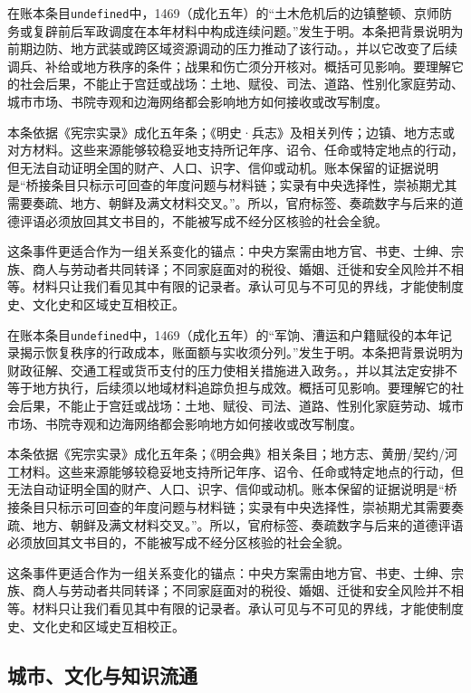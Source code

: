 在账本条目\texttt{undefined}中，1469（成化五年）的“土木危机后的边镇整顿、京师防务或复辟前后军政调度在本年材料中构成连续问题。”发生于明。本条把背景说明为前期边防、地方武装或跨区域资源调动的压力推动了该行动。，并以它改变了后续调兵、补给或地方秩序的条件；战果和伤亡须分开核对。概括可见影响。要理解它的社会后果，不能止于宫廷或战场：土地、赋役、司法、道路、性别化家庭劳动、城市市场、书院寺观和边海网络都会影响地方如何接收或改写制度。

本条依据《宪宗实录》成化五年条；《明史·兵志》及相关列传；边镇、地方志或对方材料。这些来源能够较稳妥地支持所记年序、诏令、任命或特定地点的行动，但无法自动证明全国的财产、人口、识字、信仰或动机。账本保留的证据说明是“桥接条目只标示可回查的年度问题与材料链；实录有中央选择性，崇祯期尤其需要奏疏、地方、朝鲜及满文材料交叉。”。所以，官府标签、奏疏数字与后来的道德评语必须放回其文书目的，不能被写成不经分区核验的社会全貌。

这条事件更适合作为一组关系变化的锚点：中央方案需由地方官、书吏、士绅、宗族、商人与劳动者共同转译；不同家庭面对的税役、婚姻、迁徙和安全风险并不相等。材料只让我们看见其中有限的记录者。承认可见与不可见的界线，才能使制度史、文化史和区域史互相校正。

在账本条目\texttt{undefined}中，1469（成化五年）的“军饷、漕运和户籍赋役的本年记录揭示恢复秩序的行政成本，账面额与实收须分列。”发生于明。本条把背景说明为财政征解、交通工程或货币支付的压力使相关措施进入政务。，并以其法定安排不等于地方执行，后续须以地域材料追踪负担与成效。概括可见影响。要理解它的社会后果，不能止于宫廷或战场：土地、赋役、司法、道路、性别化家庭劳动、城市市场、书院寺观和边海网络都会影响地方如何接收或改写制度。

本条依据《宪宗实录》成化五年条；《明会典》相关条目；地方志、黄册/契约/河工材料。这些来源能够较稳妥地支持所记年序、诏令、任命或特定地点的行动，但无法自动证明全国的财产、人口、识字、信仰或动机。账本保留的证据说明是“桥接条目只标示可回查的年度问题与材料链；实录有中央选择性，崇祯期尤其需要奏疏、地方、朝鲜及满文材料交叉。”。所以，官府标签、奏疏数字与后来的道德评语必须放回其文书目的，不能被写成不经分区核验的社会全貌。

这条事件更适合作为一组关系变化的锚点：中央方案需由地方官、书吏、士绅、宗族、商人与劳动者共同转译；不同家庭面对的税役、婚姻、迁徙和安全风险并不相等。材料只让我们看见其中有限的记录者。承认可见与不可见的界线，才能使制度史、文化史和区域史互相校正。

\subsection{城市、文化与知识流通}

